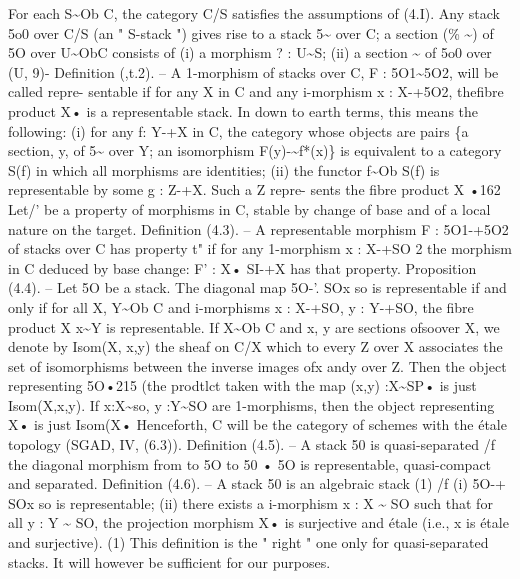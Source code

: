 \documentclass[11pt]{article}
\theoremstyle{plain}
\theoremstyle{definition}
\theoremstyle{remark}
\begin{document}
For each S\textasciitilde{}Ob C, the category C/S satisfies the assumptions of (4.I). Any stack 5o0 over C/S (an " S-stack ") gives rise to a stack 5\textasciitilde{} over C; a section (\% \textasciitilde{}) of 5O over U\textasciitilde{}ObC consists of (i) a morphism ? : U\textasciitilde{}S; (ii) a section \textasciitilde{} of 5o0 over (U, 9)- Definition (,t.2). -- A 1-morphism of stacks over C, F : 5O1\textasciitilde{}5O2, will be called repre- sentable if for any X in C and any i-morphism x : X-+5O2, thefibre product X• is a representable stack. In down to earth terms, this means the following: (i) for any f: Y-+X in C, the category whose objects are pairs \{a section, y, of 5\textasciitilde{} over Y; an isomorphism F(y)-\textasciitilde{}f*(x)\} is equivalent to a category S(f) in which all morphisms are identities; (ii) the functor f\textasciitilde{}Ob S(f) is representable by some g : Z-+X. Such a Z repre- sents the fibre product X •162 Let/' be a property of morphisms in C, stable by change of base and of a local nature on the target. Definition (4.3). -- A representable morphism F : 5O1-+5O2 of stacks over C has property t" if for any 1-morphism x : X-+SO 2 the morphism in C deduced by base change: F' : X• SI-+X has that property. Proposition (4.4). -- Let 5O be a stack. The diagonal map 5O-'. SOx so is representable if and only if for all X, Y\textasciitilde{}Ob C and i-morphisms x : X-+SO, y : Y-+SO, the fibre product X x\textasciitilde{}Y is representable. If X\textasciitilde{}Ob C and x, y are sections ofsoover X, we denote by Isom(X, x,y) the sheaf on C/X which to every Z over X associates the set of isomorphisms between the inverse images ofx andy over Z. Then the object representing 5O•215 (the prodtlct taken with the map (x,y) :X\textasciitilde{}SP• is just Isom(X,x,y). If x:X\textasciitilde{}so, y :Y\textasciitilde{}SO are 1-morphisms, then the object representing X• is just Isom(X• Henceforth, C will be the category of schemes with the étale topology (SGAD, IV, (6.3)). Definition (4.5). -- A stack 50 is quasi-separated /f the diagonal morphism from to 5O to 50 • 5O is representable, quasi-compact and separated. Definition (4.6). -- A stack 50 is an algebraic stack (1) /f (i) 5O-+ SOx so is representable; (ii) there exists a i-morphism x : X \textasciitilde{} SO such that for all y : Y \textasciitilde{} SO, the projection morphism X• is surjective and étale (i.e., x is étale and surjective). (1) This definition is the " right " one only for quasi-separated stacks. It will however be sufficient for our purposes.
\end{document}

